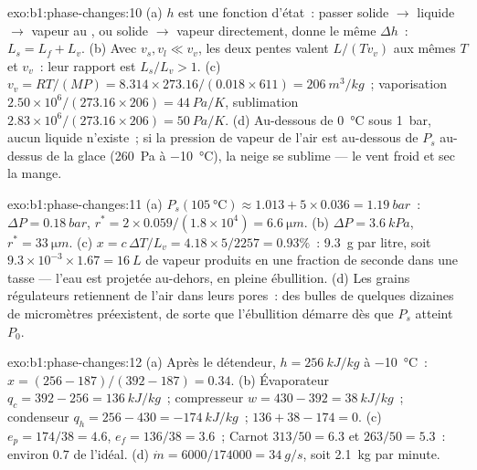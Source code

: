 \begin{solution}{exo:b1:phase-changes:10}
(a) $h$ est une fonction d'état~: passer solide $\to$ liquide $\to$ vapeur au
, ou solide $\to$ vapeur directement, donne le même $\Delta h$~:
$L_s = L_f + L_v$. (b) Avec $v_s, v_l \ll v_v$, les deux pentes valent $L/(Tv_v)$ aux
mêmes $T$ et $v_v$~: leur rapport est $L_s/L_v > 1$. (c) $v_v = RT/(MP) =
8.314 \times 273.16/(0.018 \times 611) = \qty{206}{m^3/kg}$~; vaporisation
$2.50 \times 10^6/(273.16 \times 206) = \qty{44}{Pa/K}$, sublimation $2.83 \times 10^6/
(273.16 \times 206) = \qty{50}{Pa/K}$. (d) Au-dessous de \qty{0}{\degreeCelsius}
sous \qty{1}{bar}, aucun liquide n'existe~; si la pression de vapeur de l'air
est au-dessous de $P_s$ au-dessus de la glace (\qty{260}{Pa} à
\qty{-10}{\degreeCelsius}), la neige se sublime --- le vent froid et sec la mange.
\end{solution}

\begin{solution}{exo:b1:phase-changes:11}
(a) $P_s(\qty{105}{\degreeCelsius}) \approx 1.013 + 5 \times 0.036 = \qty{1.19}{bar}$~:
$\Delta P = \qty{0.18}{bar}$, $r^\ast = 2 \times 0.059/(1.8 \times 10^4) = \qty{6.6}{\micro m}$.
(b) $\Delta P = \qty{3.6}{kPa}$, $r^\ast = \qty{33}{\micro m}$. (c) $x = c\,\Delta T/L_v =
4.18 \times 5/2257 = 0.93\%$~: \qty{9.3}{g} par litre, soit $9.3 \times 10^{-3}
\times 1.67 = \qty{16}{L}$ de vapeur produits en une fraction de seconde dans
une tasse --- l'eau est projetée au-dehors, en pleine ébullition. (d) Les grains
régulateurs retiennent de l'air dans leurs pores~: des bulles de quelques
dizaines de micromètres préexistent, de sorte que l'ébullition démarre dès que
$P_s$ atteint $P_0$.
\end{solution}

\begin{solution}{exo:b1:phase-changes:12}
(a) Après le détendeur, $h = \qty{256}{kJ/kg}$ à \qty{-10}{\degreeCelsius}~: $x =
(256 - 187)/(392 - 187) = 0.34$. (b) Évaporateur $q_c = 392 - 256 =
\qty{136}{kJ/kg}$~; compresseur $w = 430 - 392 = \qty{38}{kJ/kg}$~; condenseur
$q_h = 256 - 430 = \qty{-174}{kJ/kg}$~; $136 + 38 - 174 = 0$. (c) $e_p =
174/38 = 4.6$, $e_f = 136/38 = 3.6$~; Carnot $313/50 = 6.3$ et $263/50 =
5.3$~: environ $0.7$ de l'idéal. (d) $\dot m = 6000/174000 = \qty{34}{g/s}$,
soit \qty{2.1}{kg} par minute.
\end{solution}

